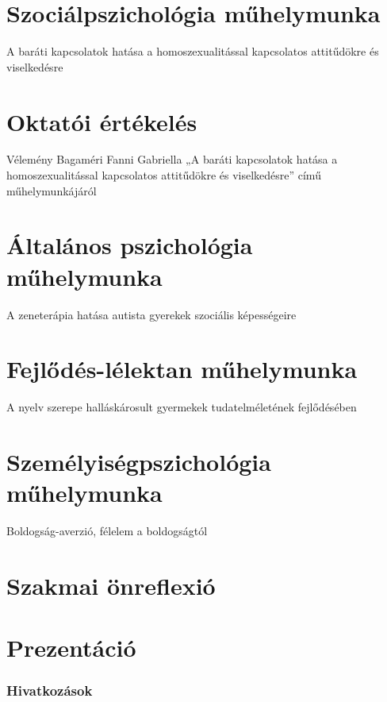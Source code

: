 \documentclass[12pt]{article}
\begin{document}




\pagebreak
\setcounter{tocdepth}{2}
\tableofcontents

\pagebreak
\justify
\newrefsection
\part{Szociálpszichológia műhelymunka}
\begin{large}
	\Large A baráti kapcsolatok hatása a  homoszexualitással kapcsolatos attitűdökre és viselkedésre
\end{large}

\printbibliography[title={Hivatkoz\'asok}]
\pagebreak
\part{Oktatói értékelés}
\begin{large}
	\large Vélemény Bagaméri Fanni Gabriella „A baráti kapcsolatok hatása a homoszexualitással kapcsolatos attitűdökre és viselkedésre” című műhelymunkájáról
\end{large}

\newrefsection
\pagebreak
\part{Általános pszichológia műhelymunka}
\begin{large}
	\Large A zeneterápia hatása autista gyerekek szociális képességeire
\end{large}

\printbibliography[title={Hivatkoz\'asok}]
\newrefsection
\pagebreak
\part{Fejlődés-lélektan műhelymunka}
\begin{large}
	\Large A nyelv szerepe halláskárosult gyermekek tudatelméletének fejlődésében
\end{large}

\printbibliography[title={Hivatkoz\'asok}]
\newrefsection
\pagebreak
\part{Személyiségpszichológia műhelymunka}
\begin{large}
	\Large Boldogság-averzió, félelem a boldogságtól
\end{large}

\printbibliography[title={Hivatkoz\'asok}]
\newrefsection
\pagebreak
\part{Szakmai önreflexió}
\pagebreak
\part{Prezentáció}
\pagebreak
\footnotesize
\section{Hivatkoz\'asok}
\end{document}
